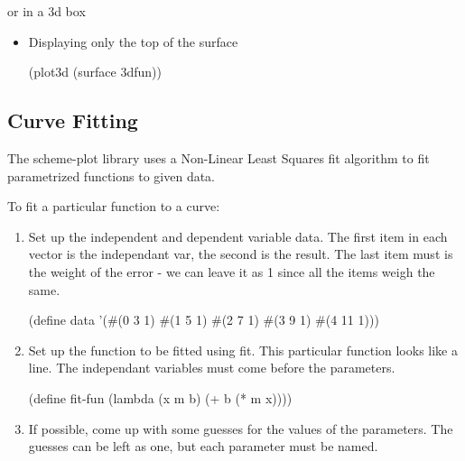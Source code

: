 \documentclass{article}
\begin{document}
{\begin{itemize}
\begin{itemize}
\end{itemize}
or in a 3d box\begin{itemize}
\item Displaying only the top of the surface
\begin{schemedisplay}
(plot3d (surface 3dfun))
\end{schemedisplay}

\end{itemize}



\end{itemize}

\label{Curve Fitting}
\subsection{Curve Fitting}



The scheme-plot library uses a Non-Linear Least Squares fit algorithm 
       to fit parametrized functions to given data.


To fit a particular function to a curve:
\begin{enumerate}
\item Set up the independent and dependent variable data. The first item in each vector is the 
independant var, the second is the result. The last item must is the weight of the error - we can leave 
it as 1 since all the items weigh the same.
\begin{schemedisplay}

(define data '(#(0 3 1)
	       #(1 5 1)
	       #(2 7 1)
	       #(3 9 1)
	       #(4 11 1)))

\end{schemedisplay}

\item Set up the function to be fitted using fit. This particular function
         looks like a line. The independant variables must come before the parameters.
\begin{schemedisplay}

(define fit-fun 
 (lambda (x m b) (+ b (* m x))))
\end{schemedisplay}

\item If possible, come up with some guesses for the values of the parameters.
        The guesses can be left as one, but each parameter must be named.



\end{enumerate}}
\end{document}
